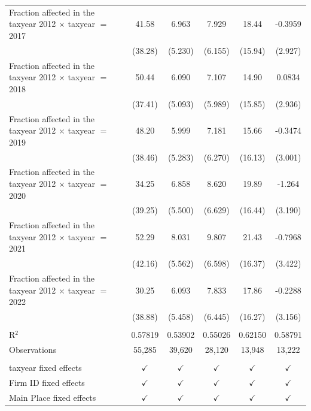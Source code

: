 \begin{tabular}{lccccc}
   Fraction affected in the taxyear 2012 $\times$ taxyear $=$ 2017  & 41.58         & 6.963         & 7.929         & 18.44         & -0.3959\\   
                                                                    & (38.28)       & (5.230)       & (6.155)       & (15.94)       & (2.927)\\   
   Fraction affected in the taxyear 2012 $\times$ taxyear $=$ 2018  & 50.44         & 6.090         & 7.107         & 14.90         & 0.0834\\   
                                                                    & (37.41)       & (5.093)       & (5.989)       & (15.85)       & (2.936)\\   
   Fraction affected in the taxyear 2012 $\times$ taxyear $=$ 2019  & 48.20         & 5.999         & 7.181         & 15.66         & -0.3474\\   
                                                                    & (38.46)       & (5.283)       & (6.270)       & (16.13)       & (3.001)\\   
   Fraction affected in the taxyear 2012 $\times$ taxyear $=$ 2020  & 34.25         & 6.858         & 8.620         & 19.89         & -1.264\\   
                                                                    & (39.25)       & (5.500)       & (6.629)       & (16.44)       & (3.190)\\   
   Fraction affected in the taxyear 2012 $\times$ taxyear $=$ 2021  & 52.29         & 8.031         & 9.807         & 21.43         & -0.7968\\   
                                                                    & (42.16)       & (5.562)       & (6.598)       & (16.37)       & (3.422)\\   
   Fraction affected in the taxyear 2012 $\times$ taxyear $=$ 2022  & 30.25         & 6.093         & 7.833         & 17.86         & -0.2288\\   
                                                                    & (38.88)       & (5.458)       & (6.445)       & (16.27)       & (3.156)\\   
    \\
   R$^2$                                                            & 0.57819       & 0.53902       & 0.55026       & 0.62150       & 0.58791\\  
   Observations                                                     & 55,285        & 39,620        & 28,120        & 13,948        & 13,222\\  
    \\
   taxyear fixed effects                                            & $\checkmark$  & $\checkmark$  & $\checkmark$  & $\checkmark$  & $\checkmark$\\   
   Firm ID fixed effects                                            & $\checkmark$  & $\checkmark$  & $\checkmark$  & $\checkmark$  & $\checkmark$\\   
   Main Place fixed effects                                         & $\checkmark$  & $\checkmark$  & $\checkmark$  & $\checkmark$  & $\checkmark$\\   
   \bottomrule
\end{tabular}
\par\endgroup
